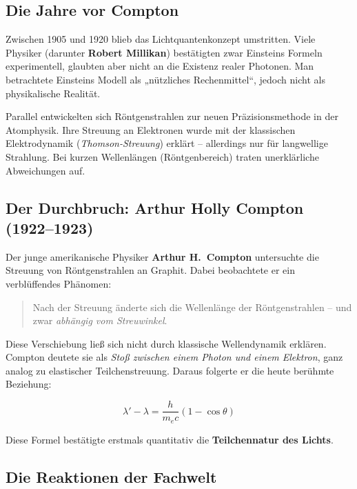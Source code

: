 \documentclass[12pt,oneside]{scrartcl}
\begin{document}
\vspace{1em}
\subsection{Die Jahre vor Compton}

Zwischen 1905 und 1920 blieb das Lichtquantenkonzept umstritten. 
Viele Physiker (darunter \textbf{Robert Millikan}) bestätigten zwar Einsteins Formeln experimentell, glaubten aber nicht an die Existenz realer Photonen.  
Man betrachtete Einsteins Modell als „nützliches Rechenmittel“, jedoch nicht als physikalische Realität.

Parallel entwickelten sich Röntgenstrahlen zur neuen Präzisionsmethode in der Atomphysik.  
Ihre Streuung an Elektronen wurde mit der klassischen Elektrodynamik (\emph{Thomson-Streuung}) erklärt – allerdings nur für langwellige Strahlung.  
Bei kurzen Wellenlängen (Röntgenbereich) traten unerklärliche Abweichungen auf.

\vspace{1em}
\subsection{Der Durchbruch: Arthur Holly Compton (1922–1923)}

Der junge amerikanische Physiker \textbf{Arthur H.~Compton} untersuchte die Streuung von Röntgenstrahlen an Graphit.  
Dabei beobachtete er ein verblüffendes Phänomen:

\begin{quote}
	Nach der Streuung änderte sich die Wellenlänge der Röntgenstrahlen – und zwar \emph{abhängig vom Streuwinkel}.
\end{quote}

Diese Verschiebung ließ sich nicht durch klassische Wellendynamik erklären.  
Compton deutete sie als \emph{Stoß zwischen einem Photon und einem Elektron}, ganz analog zu elastischer Teilchenstreuung.  
Daraus folgerte er die heute berühmte Beziehung:

\[
\lambda' - \lambda = \frac{h}{m_e c}(1 - \cos\theta)
\]

Diese Formel bestätigte erstmals quantitativ die \textbf{Teilchennatur des Lichts}.

\vspace{1em}
\subsection{Die Reaktionen der Fachwelt}
\end{document}
